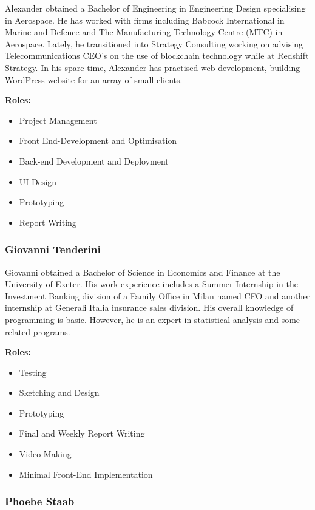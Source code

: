\documentclass[fontsize=11pt]{extarticle}
\numberwithin{figure}{section} %
\providecommand{\tightlist}{%
  \setlength{\itemsep}{0pt}\setlength{\parskip}{0pt}}
\begin{document}
Alexander obtained a Bachelor of Engineering in Engineering Design
specialising in Aerospace. He has worked with firms including Babcock
International in Marine and Defence and The Manufacturing Technology
Centre (MTC) in Aerospace. Lately, he transitioned into Strategy
Consulting working on advising Telecommunications CEO's on the use of
blockchain technology while at Redshift Strategy. In his spare time,
Alexander has practised web development, building WordPress website for
an array of small clients.

\textbf{Roles:}

\begin{itemize}
\tightlist
\item
  Project Management
\item
  Front End-Development and Optimisation
\item
  Back-end Development and Deployment
\item
  UI Design
\item
  Prototyping
\item
  Report Writing
\end{itemize}

\hypertarget{giovanni-tenderini}{%
\subsubsection{Giovanni Tenderini}\label{giovanni-tenderini}}

Giovanni obtained a Bachelor of Science in Economics and Finance at the
University of Exeter. His work experience includes a Summer Internship
in the Investment Banking division of a Family Office in Milan named CFO
and another internship at Generali Italia insurance sales division. His
overall knowledge of programming is basic. However, he is an expert in
statistical analysis and some related programs.

\textbf{Roles:}

\begin{itemize}
\tightlist
\item
  Testing
\item
  Sketching and Design
\item
  Prototyping
\item
  Final and Weekly Report Writing
\item
  Video Making
\item
  Minimal Front-End Implementation
\end{itemize}

\hypertarget{phoebe-staab}{%
\subsubsection{Phoebe Staab}\label{phoebe-staab}}
\end{document}
